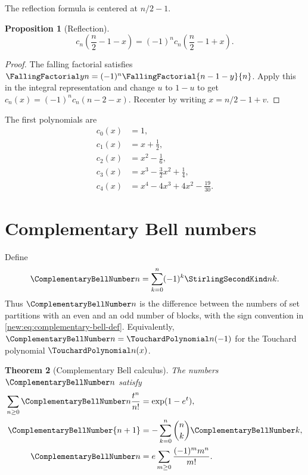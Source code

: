 \documentclass[11pt,a4paper,oneside,openany]{book}
\newtheorem{theorem}{Theorem}[chapter]
\newtheorem{proposition}[theorem]{Proposition}
\theoremstyle{definition}
\theoremstyle{remark}
\begin{document}
The reflection formula is centered at $n/2-1$.

\begin{proposition}[Reflection]
\begin{equation}
 c_n\!\left(\frac n2-1-x\right)
 =(-1)^n c_n\!\left(\frac n2-1+x\right).
 \label{new:eq:bernoulli-second-reflection}
\end{equation}
\end{proposition}

\begin{proof}
The falling factorial satisfies
$\FallingFactorial y n=(-1)^n\FallingFactorial{n-1-y}{n}$.  Apply this in the integral
representation and change $u$ to $1-u$ to get
$c_n(x)=(-1)^nc_n(n-2-x)$.  Recenter by writing
$x=n/2-1+v$.
\end{proof}

The first polynomials are
\begin{align*}
 c_0(x)&=1,\\
 c_1(x)&=x+\frac12,\\
 c_2(x)&=x^2-\frac16,\\
 c_3(x)&=x^3-\frac32x^2+\frac14,\\
 c_4(x)&=x^4-4x^3+4x^2-\frac{19}{30}.
\end{align*}

\section{Complementary Bell numbers}

Define
\begin{equation}
 \ComplementaryBellNumber n=\sum_{k=0}^n(-1)^k\StirlingSecondKind nk.
 \label{new:eq:complementary-bell-def}
\end{equation}
Thus $\ComplementaryBellNumber n$ is the difference between the numbers of set partitions with an even
and an odd number of blocks, with the sign convention in
\eqref{new:eq:complementary-bell-def}.  Equivalently, $\ComplementaryBellNumber n=\TouchardPolynomial n(-1)$ for the
Touchard polynomial $\TouchardPolynomial n(x)$.

\begin{theorem}[Complementary Bell calculus]
The numbers $\ComplementaryBellNumber n$ satisfy
\begin{align}
 \sum_{n\ge0}\ComplementaryBellNumber n\frac{t^n}{n!}&=\exp(1-e^t),
 \label{new:eq:complementary-bell-egf}\\
 \ComplementaryBellNumber{n+1}&=-\sum_{k=0}^n\binom nk\ComplementaryBellNumber k,
 \label{new:eq:complementary-bell-recurrence}\\
 \ComplementaryBellNumber n&=e\sum_{m\ge0}\frac{(-1)^m m^n}{m!}.
 \label{new:eq:complementary-bell-dobinski}
\end{align}
\end{theorem}
\end{document}

